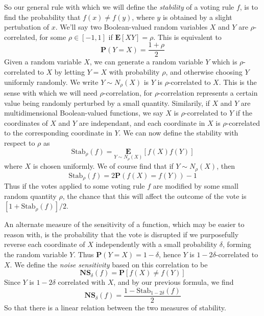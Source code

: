 So our general rule with which we will define the \emph{stability} of a voting rule $f$, is to find the probability that $f(x) \neq f(y)$, where $y$ is obtained by a slight pertubation of $x$. We'll say two Boolean-valued random variables $X$ and $Y$ are $\rho$-correlated, for some $\rho \in [-1,1]$ if $\mathbf{E}[XY] = \rho$. This is equivalent to
%
\[ \mathbf{P}(Y = X) = \frac{1 + \rho}{2} \]
%
Given a random variable $X$, we can generate a random variable $Y$ which is $\rho$-correlated to $X$ by letting $Y = X$ with probability $\rho$, and otherwise choosing $Y$ uniformly randomly. We write $Y \sim N_\rho(X)$ is $Y$ is $\rho$-correlated to $X$. This is the sense with which we will need $\rho$-correlation, for $\rho$-correlation represents a certain value being randomly perturbed by a small quantity. Similarily, if $X$ and $Y$ are multidimensional Boolean-valued functions, we say $X$ is $\rho$-correlated to $Y$ if the coordinates of $X$ and $Y$ are independant, and each coordinate in $X$ is $\rho$-correlated to the corresponding coordinate in $Y$. We can now define the stability with respect to $\rho$ as
%
\[ \text{Stab}_\rho(f) = \underset{Y \sim N_\rho(X)}{\mathbf{E}}[f(X)f(Y)] \]
%
where $X$ is chosen uniformly. We of course find that if $Y \sim N_\rho(X)$, then
%
\[\text{Stab}_\rho(f) = 2 \mathbf{P} \left( f(X) = f(Y)  \right) - 1 \]
%
Thus if the votes applied to some voting rule $f$ are modified by some small random quantity $\rho$, the chance that this will affect the outcome of the vote is $[1 + \text{Stab}_\rho(f)]/2$.

An alternate measure of the sensitivity of a function, which may be easier to reason with, is the probability that the vote is disrupted if we purposefully reverse each coordinate of $X$ independently with a small probability $\delta$, forming the random variable $Y$. Thus $\mathbf{P}(Y = X) = 1 - \delta$, hence $Y$ is $1 - 2\delta$-correlated to $X$. We define the \emph{noise sensitivity} based on this correlation to be
%
\[ \mathbf{NS}_\delta(f) = \mathbf{P}[ f(X) \neq f(Y) ]\]
%
Since $Y$ is $1 - 2\delta$ correlated with $X$, and by our previous formula, we find
%
\[ \mathbf{NS}_\delta(f) = \frac{1 - \text{Stab}_{1 - 2\delta}(f)}{2} \]
%
So that there is a linear relation between the two measures of stability.

